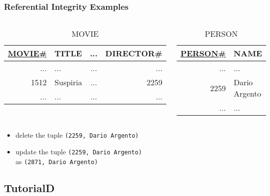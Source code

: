 \documentclass[dvipsnames]{beamer}
\theoremstyle{plain}
\begin{document}
\begin{frame}
  \frametitle{Referential Integrity Examples}

  \begin{columns}[t]
    \begin{footnotesize}
    \begin{table}
      \caption{MOVIE}
      \begin{tabular}{|r|l|c|r|}\hline
\underline{MOVIE\#} & TITLE & ... & DIRECTOR\#\\[2pt]\hline\hline
                ... & ...      & ... &        ...\\\hline
               1512 & Suspiria & ... &       2259\\\hline
                ... & ...      & ... &        ...\\\hline
      \end{tabular}
    \end{table}
    \end{footnotesize}

    \begin{footnotesize}
    \begin{table}
      \caption{PERSON}
      \begin{tabular}{|r|l|}\hline
\underline{PERSON\#} & NAME\\[2pt]\hline\hline
        ... & ...          \\\hline
       2259 & Dario Argento\\\hline
        ... & ...          \\\hline
      \end{tabular}
    \end{table}
    \end{footnotesize}
  \end{columns}

  \begin{itemize}
    \item delete the tuple \texttt{(2259, Dario Argento)}
    \item update the tuple \texttt{(2259, Dario Argento)}\\
      as \texttt{(2871, Dario Argento)}
  \end{itemize}
\end{frame}

\subsection{TutorialD}
\end{document}
